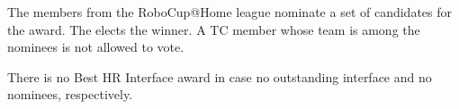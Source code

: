 The  members from the RoboCup@Home league nominate a set of candidates for the award. The  elects the winner. A TC member whose team is among the nominees is not allowed to vote.
 
There is no Best HR Interface award in case no outstanding interface and no nominees, respectively.




%
%
%

